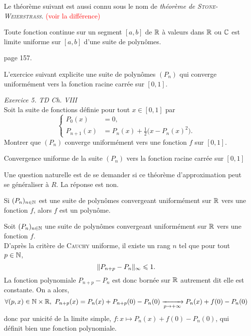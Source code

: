 Le théorème suivant est aussi connu sous le nom  de \emph{théorème de \textsc{Stone-Weierstrass}}. \textcolor{red}{(voir la différence)}

\begin{theo}
    Toute fonction continue sur un segment $[a, b]$ de $\mathbb{R}$ à valeurs dans $\mathbb{R}$ ou $\mathbb{C}$ est limite uniforme sur $[a, b]$ d'une suite de polynômes.
\end{theo}

\begin{preuve}
    \cite{calcul_infinitesimal} page 157.
\end{preuve} 

L'exercice suivant explicite une suite de polynômes $(P_n)$ qui converge uniformément vers la fonction racine carrée sur $[0, 1]$.

\begin{exercice}
    \emph{Exercice 5. TD Ch. VIII}\\
    Soit la suite de fonctions définie pour tout $x \in [0, 1]$ par
    $$
    \begin{cases}
        P_0(x) &= 0,\\
        P_{n+1}(x) &= P_n (x) + \frac{1}{2} \big( x-P_n (x)^2 \big).
    \end{cases}
    $$
    Montrer que $(P_n)$ converge uniformément vers une fonction $f$ sur $[0, 1]$.
\end{exercice}

\begin{marginfigure}[-5cm]
    \centering
	
	\caption*{\centering Convergence uniforme de la suite $(P_n)$ vers la fonction racine carrée sur $[0,1]$}
\end{marginfigure}

Une question naturelle est de se demander si ce théorème d'approximation peut se généraliser à $R$. La réponse est non.

\begin{prop}
    Si $(P_n)_{n \in \mathbb{N}}$ est une suite de polynômes convergeant uniformément sur $\mathbb{R}$ vers une fonction $f$, alors $f$ est un polynôme.
\end{prop}

\begin{preuve}
    Soit $(P_n)_{n \in \mathbb{N}}$ une suite de polynômes convergeant uniformément sur $\mathbb{R}$ vers une fonction $f$. \\
    D'après la critère de \textsc{Cauchy} uniforme, il existe un rang $n$ tel que pour tout $p \in \mathbb{N}$, 
    $$\Vert P_{n+p} - P_n \Vert_\infty \leqslant 1.$$
    La fonction polynomiale $P_{n+p} - P_n$ est donc bornée sur $\mathbb{R}$ autrement dit elle est constante. On a alors,
    $$\forall (p, x) \in \mathbb{N} \times \mathbb{R},\ P_{n+p}(x) = P_n(x) + P_{n+p}(0) - P_n(0) \xrightarrow[p \to + \infty]{} P_n(x) + f(0) - P_n(0)$$
    donc par unicité de la limite simple, $f : x \mapsto P_n(x) + f(0) - P_n(0)$, qui définit bien une fonction polynomiale. 
\end{preuve}